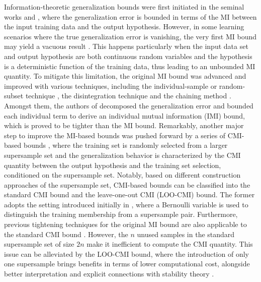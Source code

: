 \documentclass[onecolumn,romanappendices,10pt]{IEEEtran}
\begin{document}
	Information-theoretic generalization bounds were first initiated in the seminal works \cite{russo2016controlling} and \cite{xu2017information}, where the generalization error is bounded in terms of the MI between the input training data and the output hypothesis. However, in some learning scenarios where the true generalization error is vanishing, the very first MI bound may yield a vacuous result \cite{bu2020tightening}. This happens particularly when the input data set and output hypothesis are both continuous random variables and the hypothesis is a deterministic function of the training data, thus leading to an unbounded MI quantity. To mitigate this limitation, the original MI bound was advanced and improved with various techniques, including the individual-sample or random-subset technique \cite{bu2020tightening,harutyunyan2021information,rodriguez2021random}, the disintegration technique \cite{negrea2019information} and the chaining method \cite{asadi2018chaining,zhou2023stochastic}. Amongst them, the authors of \cite{bu2020tightening} decomposed the generalization error and bounded each individual term to derive an individual mutual information (IMI) bound, which is proved to be tighter than the MI bound. Remarkably, another major step to improve the MI-based bounds was pushed forward by a series of CMI-based bounds \cite{steinke2020reasoning,haghifam2020sharpened,zhou2022individually,rammal2022leave,haghifam2022understanding}, where the training set is randomly selected from a larger supersample set and the generalization behavior is characterized by the CMI quantity between the output hypothesis and the training set selection, conditioned on the supersample set. Notably, based on different construction approaches of the supersample set, CMI-based bounds can be classified into the standard CMI bound and the leave-one-out CMI (LOO-CMI) bound. The former adopts the setting introduced initially in \cite{steinke2020reasoning}, where a Bernoulli variable is used to distinguish the training membership from a supersample pair. Furthermore, previous tightening techniques for the original MI bound are also applicable to the standard CMI bound \cite{haghifam2020sharpened,rodriguez2021random,zhou2022individually}. However, the $n$ unused samples in the standard supersample set of size $2n$ make it inefficient to compute the CMI quantity. This issue can be alleviated by the LOO-CMI bound, where the introduction of only one supersample brings benefits in terms of lower computational cost, alongside better interpretation and explicit connections with stability theory \cite{rammal2022leave,haghifam2022understanding}.
	
\end{document}
